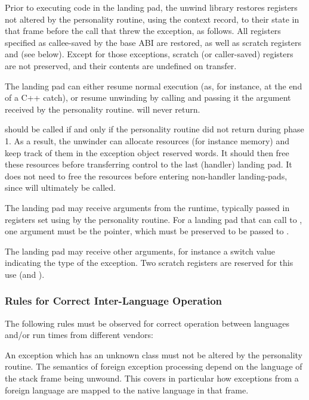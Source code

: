 Prior to executing code in the landing pad, the unwind library restores
registers not altered by the personality routine, using the context
record, to their state in that frame before the call that threw the exception,
as follows. All registers specified as callee-saved by the base ABI are
restored, as well as scratch registers \EAX and \EDX (see below).
Except for those exceptions, scratch (or caller-saved) registers are not
preserved, and their contents are undefined on transfer.

The landing pad can either resume normal execution (as, for instance, at
the end of a C++ catch), or resume unwinding by calling  and
passing it the  argument received by the personality routine.
 will never return.

 should be called if and only if the personality routine
did not return  during phase 1.  As a result,
the unwinder can allocate resources (for instance memory) and keep track
of them in the exception object reserved words. It should then free these
resources before transferring control to the last (handler) landing pad.
It does not need to free the resources before entering non-handler
landing-pads, since  will ultimately be called.

\begin{sloppypar}
The landing pad may receive arguments from the runtime, typically passed
in registers set using  by the personality routine.
For a landing pad that can call to , one argument must
be the  pointer, which must be preserved to be passed to
.
\end{sloppypar}

The landing pad may receive other arguments, for instance a switch value
indicating the type of the exception. Two scratch registers are reserved
for this use (\EAX and \EDX).

\subsubsection{Rules for Correct Inter-Language Operation}

The following rules must be observed for correct operation between
languages and/or run times from different vendors:

An exception which has an unknown class must not be altered by the
personality routine. The semantics of foreign exception processing
depend on the language of the stack frame being unwound. This covers
in particular how exceptions from a foreign language are mapped to
the native language in that frame.

